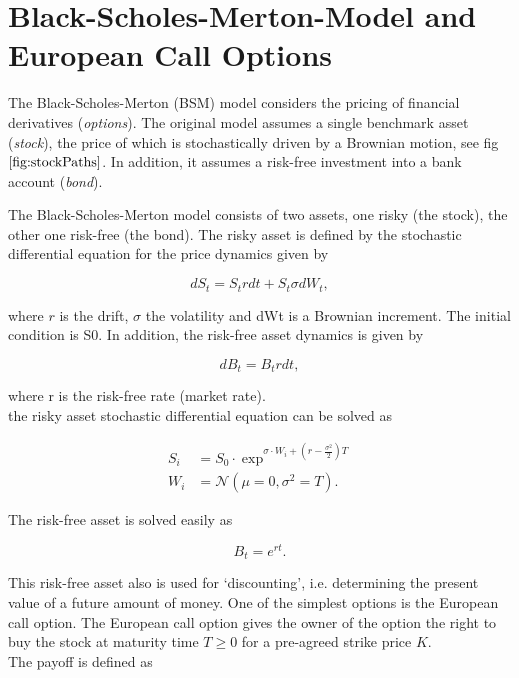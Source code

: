 \documentclass[../main.tex]{subfiles}
\begin{document}
\section{Black-Scholes-Merton-Model and European Call Options}\label{sec: bms}

The Black-Scholes-Merton (BSM) model considers the pricing of financial derivatives (\emph{options}). The original model assumes a single benchmark asset (\emph{stock}), the price of which is stochastically driven by a Brownian motion, see fig $\ref{fig:stockPaths}$. In addition, it assumes a risk-free investment into a bank account (\emph{bond}).

The Black-Scholes-Merton model consists of two assets, one risky (the stock), the other one risk-free (the bond). The risky asset is defined by the stochastic differential equation for the price dynamics given by

\begin{equation}
    dS_t = S_t r dt + S_t \sigma dW_t,
    \label{eq: risky}
\end{equation}

where $r$ is the drift, $\sigma$ the volatility and dWt is a Brownian increment. The initial condition is S0. In addition, the risk-free asset dynamics is given by

\begin{equation}
   dB_t = B_t r dt, 
\end{equation}

where r is the risk-free rate (market rate).\\
the risky asset stochastic differential equation can be solved as

\begin{align}
	   S_i &=S_{0}\cdot\exp^{\sigma \cdot W_i+(r-\frac{\sigma^2}{2})T} \label{eq:S_T} \\
	   W_i &= \mathcal{N}(\mu=0,\sigma^2=T) \label{eq:W_T}.
\end{align}

The risk-free asset is solved easily as

\begin{equation}
    B_t = e^{rt}.
\end{equation}

This risk-free asset also is used for ‘discounting’, i.e. determining the present value of a future amount of money.
One of the simplest options is the European call option. The European call option gives the owner of the option the right to buy the stock at maturity time $T \geq 0$ for a pre-agreed strike price $K$.\\
The payoff is defined as
\end{document}
